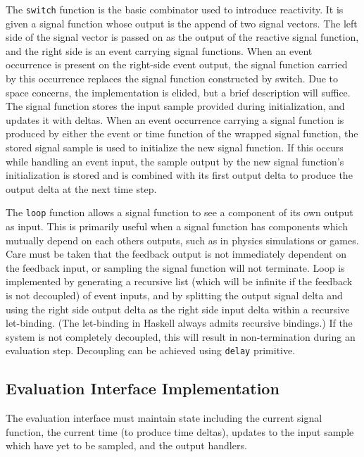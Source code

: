 \documentclass[draft]{llncs}
\begin{document}
The {\tt switch} function is the basic combinator used to introduce reactivity.
It is given a signal function whose output is the append of two signal vectors.
The left side of the signal vector is passed on as the output of the reactive
signal function, and the right side is an event carrying signal functions. When
an event occurrence is present on the right-side event output, the signal
function carried by this occurrence replaces the signal function constructed
by switch. Due to space concerns, the implementation is elided, but a brief
description will suffice. The signal function stores the input sample
provided during initialization, and updates it with deltas. When an event
occurrence carrying a signal function is produced by either the event or 
time function of the wrapped signal function, the stored signal sample is used
to initialize the new signal function. If this occurs while handling an event
input, the sample output by the new signal function's initialization is stored
and is combined with its first output delta to produce the output delta at the
next time step.

The {\tt loop} function allows a signal function to see a component of its own
output as input. This is primarily useful when a signal function has components
which mutually depend on each others outputs, such as in physics simulations
or games. Care must be taken that the feedback output is not immediately
dependent on the feedback input, or sampling the signal function will not
terminate. Loop is implemented by generating a recursive list (which will
be infinite if the feedback is not decoupled) of event inputs, and by splitting
the output signal delta and using the right side output delta as the right
side input delta within a recursive let-binding. (The let-binding in Haskell
always admits recursive bindings.) If the system is not completely decoupled,
this will result in non-termination during an evaluation step. Decoupling can
be achieved using {\tt delay} primitive.

\subsection{Evaluation Interface Implementation}
\label{subsection:Evaluation_Interface_Implementation}

The evaluation interface must maintain state including the current signal
function, the current time (to produce time deltas), updates to the input
sample which have yet to be sampled, and the output handlers.
\end{document}
